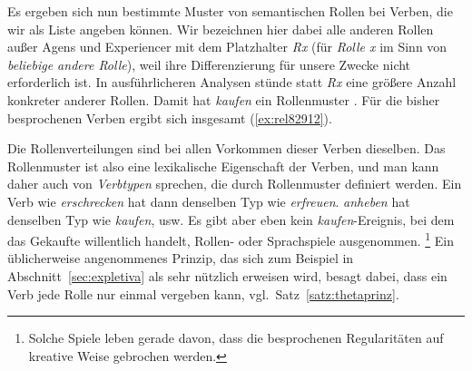 

Es ergeben sich nun bestimmte Muster von semantischen Rollen bei Verben, die wir als Liste angeben können.
Wir bezeichnen hier dabei alle anderen Rollen außer Agens und Experiencer mit dem Platzhalter \textit{Rx} (für \textit{Rolle x} im Sinn von \textit{beliebige andere Rolle}), weil ihre Differenzierung für unsere Zwecke nicht erforderlich ist.
In ausführlicheren Analysen stünde statt \textit{Rx} eine größere Anzahl konkreter anderer Rollen.
Damit hat \zB \textit{kaufen} ein Rollenmuster .
Für die bisher besprochenen Verben ergibt sich insgesamt (\ref{ex:rel82912}).

\begin{exe}
  \ex\label{ex:rel82912}
  \begin{xlist}
  \end{xlist}
\end{exe}

Die Rollenverteilungen sind bei allen Vorkommen dieser Verben dieselben.
Das Rollenmuster ist also eine lexikalische Eigenschaft der Verben, und man kann daher auch von \textit{Verbtypen} sprechen, die durch Rollenmuster definiert werden.
Ein Verb wie \textit{erschrecken} hat dann denselben Typ wie \textit{erfreuen}.
\textit{anheben} hat denselben Typ wie \textit{kaufen}, usw.
Es gibt aber eben kein \textit{kaufen}-Ereignis, bei dem das Gekaufte willentlich handelt, Rollen- oder Sprachspiele ausgenommen.%
\footnote{Solche Spiele leben gerade davon, dass die besprochenen Regularitäten auf kreative Weise gebrochen werden.}
Ein üblicherweise angenommenes Prinzip, das sich zum Beispiel in Abschnitt~\ref{sec:expletiva} als sehr nützlich erweisen wird, besagt dabei, dass ein Verb jede Rolle nur einmal vergeben kann, vgl.\ Satz~\ref{satz:thetaprinz}.



